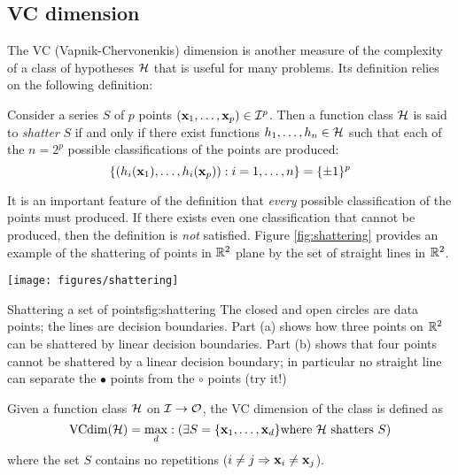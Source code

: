 \subsection{VC dimension}
\label{acr:vcdim}
\label{sec:vcdim}

The VC (Vapnik-Chervonenkis) dimension is another measure of the
complexity of a class of hypotheses $\mathcal{H}$ that is useful for many
problems.  Its definition relies on the following definition:

\begin{definition}[Shattering]
Consider a series $S$ of $p$ points $(\mathbf{x}_1, \ldots, \mathbf{x}_p) \in
\mathcal{I}^p$.  Then a function class $\mathcal{H}$ is said to \emph{shatter} $S$ 
if and only if there exist functions $h_1, \ldots, h_n \in \mathcal{H}$ such
that each of the $n = 2^p$ possible classifications of the points are
produced: 
%
\begin{equation}
\left\{ (h_i(\mathbf{x}_1), \ldots, h_i(\mathbf{x}_p)): i=1, \ldots, n \right\}
= \{\pm 1\}^p
\end{equation}
%
\end{definition}

It is an important feature of the definition that \emph{every}
possible classification of the points must produced.  If there exists
even one classification that cannot be produced, then the definition
is \emph{not} satisfied.  Figure \ref{fig:shattering} provides an
example of the shattering of points in $\mathbb{R}^2$ plane by the set of
straight lines in $\mathbb{R}^2$. 

\begin{linefigure}
\begin{center}
\texttt{[image: figures/shattering]}
\end{center}
\begin{capt}{Shattering a set of points}{fig:shattering}
The closed and open circles are data points; the lines are decision
boundaries.  Part (a) shows how three points on $\mathbb{R}^2$ can be
shattered by linear decision boundaries.  Part (b) shows that four
points cannot be shattered by a linear decision boundary; in
particular no straight line can separate the $\bullet$ points from the
$\circ$ points (try it!)
\end{capt}
\end{linefigure}

\begin{definition}[VC dimension]
\label{thm:vcdim bound}
Given a function class $\mathcal{H}$ on $\mathcal{I} \rightarrow \mathcal{O}$, the VC
dimension of the class is defined as
%
\begin{equation}
\mathrm{VCdim}(\mathcal{H}) = \max_{d} : ( \exists S = \{\mathbf{x}_1, \ldots, \mathbf{x}_d\} 
\mbox{\rm where $\mathcal{H}$ shatters $S$})
\end{equation}
%
where the set $S$ contains no repetitions ($i \neq j \Rightarrow
\mathbf{x}_i \neq \mathbf{x}_j$).
\end{definition}

